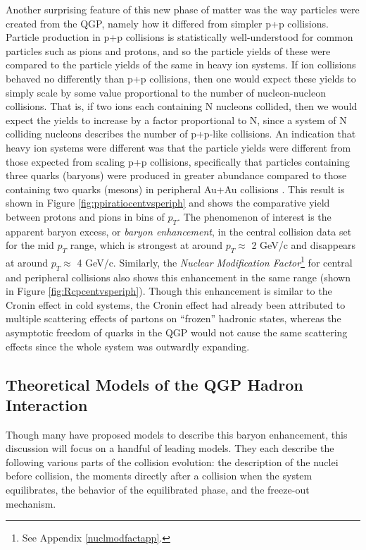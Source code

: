 Another surprising feature of this new phase of matter was the way particles were created from the QGP, namely how it differed from simpler p+p collisions. Particle production in p+p collisions is statistically well-understood for common particles such as pions and protons, and so the particle yields of these were compared to the particle yields of the same in heavy ion systems. If ion collisions behaved no differently than p+p collisions, then one would expect these yields to simply scale by some value proportional to the number of nucleon-nucleon collisions. That is, if two ions each containing N nucleons collided, then we would expect the yields to increase by a factor proportional to N, since a system of N colliding nucleons describes the number of p+p-like collisions. An indication that heavy ion systems were different was that the particle yields were different from those expected from scaling p+p collisions, specifically that particles containing three quarks (baryons) were produced in greater abundance compared to those containing two quarks (mesons) in peripheral Au+Au collisions \citep{PhysRevLett.97.152301}. This result is shown in Figure \ref{fig:ppiratiocentvsperiph} and shows the comparative yield between protons and pions in bins of $p_{T}$. The phenomenon of interest is the apparent baryon excess, or \textit{baryon enhancement}, in the central collision data set for the mid $p_{T}$ range, which is strongest at around $p_{T}\approx$ 2 GeV/c and disappears at around $p_{T}\approx$ 4 GeV/c. Similarly, the \textit{Nuclear Modification Factor}\footnote{See Appendix \ref{nuclmodfactapp}.} for central and peripheral collisions also shows this enhancement in the same range (shown in Figure \ref{fig:Rcpcentvsperiph}). Though this enhancement is similar to the Cronin effect in cold systems, the Cronin effect had already been attributed to multiple scattering effects of partons on ``frozen'' hadronic states, whereas the asymptotic freedom of quarks in the QGP would not cause the same scattering effects since the whole system was outwardly expanding.

\subsection{Theoretical Models of the QGP Hadron Interaction}
Though many have proposed models to describe this baryon enhancement, this discussion will focus on a handful of leading models. They each describe the following various parts of the collision evolution: the description of the nuclei before collision, the moments directly after a collision when the system equilibrates, the behavior of the equilibrated phase, and the freeze-out mechanism.

